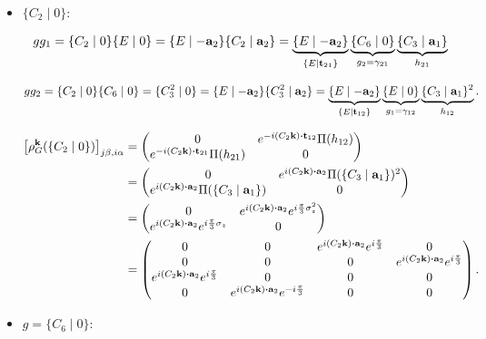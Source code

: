\begin{itemize}
\item $\{C_2\mid 0\}$:

\begin{equation} \label{eq:spinful_graphene_generator_C2_g1_induced}
gg_1 = \{C_2 \mid 0\} \{E \mid 0\} = \{E\mid-{\vb{a}}_2\} \{C_2 \mid {\vb{a}}_2\} = \underbrace{\{E \mid -{\vb{a}}_2\}}_{\{E\mid{\vb{t}}_{21}\}} \underbrace{\{C_6 \mid 0\}}_{g_2 = \gamma_{21}} \underbrace{\{C_3 \mid {\vb{a}}_1\}}_{h_{21}}
\end{equation}

\begin{equation} \label{eq:spinful_graphene_C2_gg2}
gg_2 = \{C_2\mid 0\}\{C_6\mid 0\}= \{C_3^2\mid0\} = \{E\mid-{\vb{a}}_2\}\{C_3^2\mid{\vb{a}}_2\} = \underbrace{\{E\mid -{\vb{a}}_2\}}_{\{E\mid {\vb{t}}_{12}\}} \underbrace{\{E \mid 0\}}_{g_1 = \gamma_{12}} \underbrace{\{C_3 \mid {\vb{a}}_1\}^2}_{h_{12}}.
\end{equation}

\begin{align} \label{eq:rhoC2_inducedrep_k_jbia}
\qty[\rho_G^\k(\{C_2\mid0\})]_{j\beta,i\alpha} &=
\begin{pmatrix}
0 & e^{-i(C_2 \k) \vdot \t_{12}} \Pi(h_{12}) \\
e^{-i(C_2 \k) \vdot \t_{21}} \Pi(h_{21}) & 0
\end{pmatrix} \\
&=
\begin{pmatrix}
0 & e^{i(C_2 \k) \vdot \a_2} \Pi(\{C_3\mid\a_1\})^2 \\
e^{i(C_2 \k) \vdot \a_2} \Pi(\{C_3\mid\a_1\}) & 0
\end{pmatrix} \\
&=
\begin{pmatrix}
0 & e^{i(C_2 \k) \vdot \a_2} e^{i\frac{\pi}{3} \sigma_z^2} \\
e^{i(C_2 \k) \vdot \a_2} e^{i\frac{\pi}{3} \sigma_z} & 0
\end{pmatrix} \\
&=
\begin{pmatrix}
0 & 0 & e^{i(C_2 \k) \vdot \a_2} e^{i\frac{\pi}{3}} & 0 \\
0 & 0 & 0 & e^{i(C_2 \k) \vdot \a_2} e^{i\frac{\pi}{3}} \\
e^{i(C_2 \k) \vdot \a_2} e^{i\frac{\pi}{3}} & 0 & 0 & 0 \\
0 & e^{i(C_2 \k) \vdot \a_2} e^{-i\frac{\pi}{3}} & 0 & 0 \\
\end{pmatrix}.
\end{align}


\item $g = \{C_6 \mid 0\}$:


\end{itemize}

